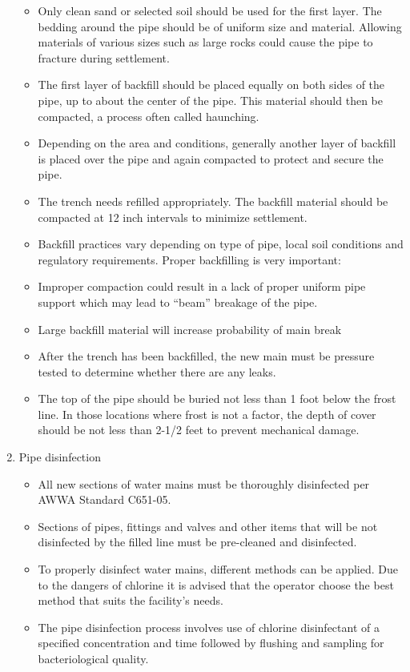 \begin{enumerate}
\begin{itemize}
\item Only clean sand or selected soil should be used for the first layer. The bedding around the pipe should be of uniform size and material. Allowing materials of various sizes such as large rocks could cause the pipe to fracture during settlement.
\item The first layer of backfill should be placed equally on both sides of the pipe, up to about the center of the pipe. This material should then be compacted, a process often called haunching.
\item Depending on the area and conditions, generally another layer of backfill is placed over the pipe and again compacted to protect and secure the pipe.
\item The trench needs refilled appropriately. The backfill material should be compacted at 12 inch intervals to minimize settlement.
\item Backfill practices vary depending on type of pipe, local soil conditions and regulatory requirements. Proper backfilling is very important:
\item Improper compaction could result in a lack of proper uniform pipe support which may lead to “beam” breakage of the pipe. 
\item Large backfill material will increase probability of main break
\item After the trench has been backfilled, the new main must be pressure tested to determine whether there are any leaks.
\item The top of the pipe should be buried not less than 1 foot below the frost line. In those locations where frost is not a factor, the depth of cover should be not less than 2-1/2 feet to prevent mechanical damage.
\end{itemize}
\item Pipe disinfection
\begin{itemize}
\item All new sections of water mains must be thoroughly disinfected per AWWA Standard C651-05.
\item Sections of pipes, fittings and valves and other items that will be not disinfected by the filled line must be pre-cleaned and disinfected.
\item To properly disinfect water mains, different methods can be applied. Due to the dangers of chlorine it is advised that the operator choose the best method that suits the facility's needs.
\item The pipe disinfection process involves use of chlorine disinfectant of a specified concentration and time followed by flushing and sampling for bacteriological quality.

\end{itemize}
\end{enumerate}

